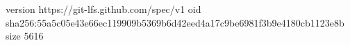 version https://git-lfs.github.com/spec/v1
oid sha256:55a5c05e43e66ec119909b5369b6d42eed4a17c9be6981f3b9e4180cb1123e8b
size 5616
